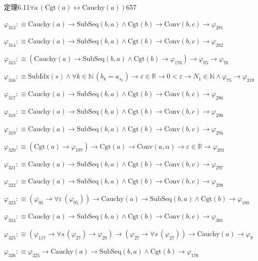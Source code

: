 \begin{fullproof}{定理6.11}{$\forall a\,(\mathrm{Cgt}(a) \leftrightarrow \mathrm{Cauchy}(a))$}{657}
\begin{abbrevlist}
\item $\varphi_{313} :\equiv \mathrm{Cauchy}(a) \to \mathrm{SubSeq}(b,a) \land \mathrm{Cgt}(b) \to \mathrm{Conv}(b,c) \to \varphi_{281}$
\item $\varphi_{314} :\equiv \mathrm{Cauchy}(a) \to \mathrm{SubSeq}(b,a) \land \mathrm{Cgt}(b) \to \mathrm{Conv}(b,c) \to \varphi_{282}$
\item $\varphi_{315} :\equiv (\mathrm{Cauchy}(a) \to \mathrm{SubSeq}(b,a) \land \mathrm{Cgt}(b) \to \varphi_{176}) \to \varphi_{95} \to \varphi_{76}$
\item $\varphi_{316} :\equiv \mathrm{SubIdx}(s) \land \forall k \in \mathbb{N}\,(b_{k} = a_{s_{k}}) \to \varepsilon \in \mathbb{R} \to 0 < \varepsilon \to N_{1} \in \mathbb{N} \land \varphi_{75} \to \varphi_{219}$
\item $\varphi_{317} :\equiv \mathrm{Cauchy}(a) \to \mathrm{SubSeq}(b,a) \land \mathrm{Cgt}(b) \to \mathrm{Conv}(b,c) \to \varphi_{286}$
\item $\varphi_{318} :\equiv \mathrm{Cauchy}(a) \to \mathrm{SubSeq}(b,a) \land \mathrm{Cgt}(b) \to \mathrm{Conv}(b,c) \to \varphi_{290}$
\item $\varphi_{319} :\equiv \mathrm{Cauchy}(a) \to \mathrm{SubSeq}(b,a) \land \mathrm{Cgt}(b) \to \mathrm{Conv}(b,c) \to \varphi_{294}$
\item $\varphi_{320} :\equiv (\mathrm{Cgt}(a) \to \varphi_{197}) \to \mathrm{Cgt}(a) \to \mathrm{Conv}(a,\alpha) \to \varepsilon \in \mathbb{R} \to \varphi_{201}$
\item $\varphi_{321} :\equiv \mathrm{Cauchy}(a) \to \mathrm{SubSeq}(b,a) \land \mathrm{Cgt}(b) \to \mathrm{Conv}(b,c) \to \varphi_{297}$
\item $\varphi_{322} :\equiv \mathrm{Cauchy}(a) \to \mathrm{SubSeq}(b,a) \land \mathrm{Cgt}(b) \to \mathrm{Conv}(b,c) \to \varphi_{298}$
\item $\varphi_{323} :\equiv (\varphi_{95} \to \forall \varepsilon\,(\varphi_{95})) \to \mathrm{Cauchy}(a) \to \mathrm{SubSeq}(b,a) \land \mathrm{Cgt}(b) \to \varphi_{180}$
\item $\varphi_{324} :\equiv \mathrm{Cauchy}(a) \to \mathrm{SubSeq}(b,a) \land \mathrm{Cgt}(b) \to \mathrm{Conv}(b,c) \to \varphi_{301}$
\item $\varphi_{325} :\equiv (\varphi_{117} \to \forall s\,(\varphi_{27}) \to \varphi_{29}) \to (\varphi_{27} \to \forall s\,(\varphi_{27})) \to \mathrm{Cauchy}(a) \to \varphi_{9}$
\item $\varphi_{326} :\equiv \varphi_{225} \to \mathrm{Cauchy}(a) \to \mathrm{SubSeq}(b,a) \land \mathrm{Cgt}(b) \to \varphi_{176}$

\end{abbrevlist}
\end{fullproof}
